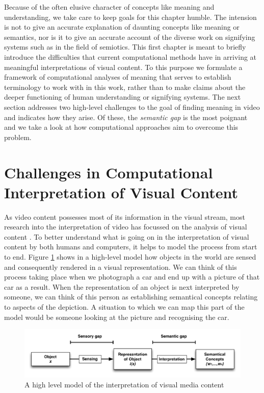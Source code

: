 Because of the often elusive character of concepts like meaning and understanding, we take care to keep goals for this chapter humble. The intension is not to give an accurate explanation of daunting concepts like meaning or semantics, nor is it to give an accurate account of the diverse work on signifying systems such as in the field of semiotics. This first chapter is meant to briefly introduce the difficulties that current computational methods have in arriving at meaningful interpretations of visual content. To this purpose we formulate a framework of computational analyses of meaning that serves to establish terminology to work with in this work, rather than to make claims about the deeper functioning of human understanding or signifying systems. The next section addresses two high-level challenges to the goal of finding meaning in video and indicates how they arise. Of these, the \emph{semantic gap} is the most poignant and we take a look at how computational approaches aim to overcome this problem.


\section{Challenges in Computational Interpretation of Visual Content}

As video content possesses most of its information in the visual stream, most research into the interpretation of video has focussed on the analysis of visual content \cite[ch.~2]{Snoek:2009dq}. To better understand what is going on in the interpretation of visual content by both humans and computers, it helps to model the process from start to end. Figure \ref{fig:understanding_visuals} shows in a high-level model how objects in the world are sensed and consequently rendered in a visual representation. We can think of this process taking place when we photograph a car and end up with a picture of that car as a result. When the representation of an object is next interpreted by someone, we can think of this person as establishing semantical concepts relating to aspects of the depiction. A situation to which we can map this part of the model would be someone looking at the picture and recognising the car.

\begin{figure}[htbp]
  \centering
    \includegraphics[width=.8\textwidth]{img/understanding_visuals}
  \caption{A high level model of the interpretation of visual media content}
  \label{fig:understanding_visuals}
\end{figure}

